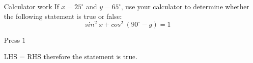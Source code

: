 \begin{wex}
{Calculator work}
{If $x=25^{\circ}$ and $y=65^{\circ}$, use your calculator to determine whether the following statement is true or false:
\begin{equation*}
sin^{2}~x + cos^{2}~(90^{\circ}-y) = 1
\end{equation*}
}
{
Press \fbox{(}   \fbox{)}  \fbox{\LARGE +} \fbox{(}  \fbox{(}  \fbox{\LARGE -}  \fbox{)} \fbox{)}   \fbox{\LARGE =} $1$


LHS = RHS therefore the statement is true.



}
\end{wex}

